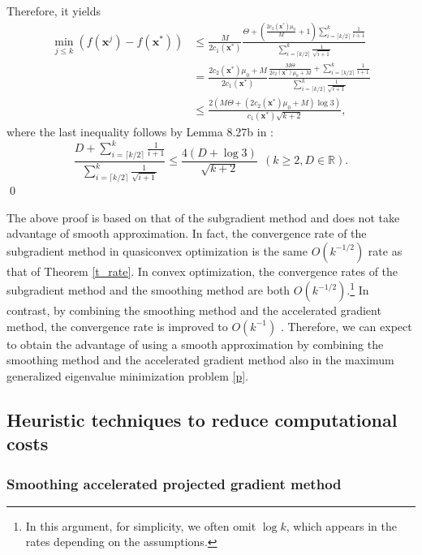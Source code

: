 \documentclass[sn-mathphys,Numbered]{sn-jnl}%
\theoremstyle{thmstyleone}%
\theoremstyle{thmstyletwo}%
\theoremstyle{thmstylethree}%
\newcommand{\e}[1]{\begin{equation}#1\end{equation}}
\begin{document}
Therefore, it yields
\begin{align}
\underset{j\le k}{\min}\left(f(\bm{x}^j)-f(\bm{x}^*)\right)
& \le \frac{M}{2c_1(\bm{x}^*)} \frac{\Theta+\left(\frac{2c_2(\bm{x}^*)\mu_0}{M} + 1\right)\sum_{i=\lceil k/2 \rceil}^{k}\frac{1}{i+1}}{\sum_{i=\lceil k/2 \rceil}^{k}\frac{1}{\sqrt{i+1}}}\\
& = \frac{2c_2(\bm{x}^*)\mu_0+M}{2c_1(\bm{x}^*)} \frac{\frac{M\Theta}{2c_2(\bm{x}^*)\mu_0+M}+\sum_{i=\lceil k/2 \rceil}^{k}\frac{1}{i+1}}{\sum_{i=\lceil k/2 \rceil}^{k}\frac{1}{\sqrt{i+1}}}\\
& \le \frac{2(M\Theta+(2c_2(\bm{x}^*)\mu_0+M)\log 3)}{c_1(\bm{x}^*)\sqrt{k+2}},
\end{align}
where the last inequality follows by Lemma 8.27b in \cite{beck17}:
\e{
\frac{D+\sum_{i=\lceil k/2 \rceil}^{k}\frac{1}{i+1}}{\sum_{i=\lceil k/2 \rceil}^{k}\frac{1}{\sqrt{i+1}}} \le \frac{4(D+\log 3)}{\sqrt{k+2}}\ \ (k\ge 2, D\in\mathbb{R}).
}
\qed

The above proof is based on that of the subgradient method and does not take advantage of smooth approximation. In fact, the convergence rate of the subgradient method in quasiconvex optimization \cite{kiwiel01} is the same $O(k^{-1/2})$ rate as that of Theorem \ref{t_rate}. In convex optimization, the convergence rates of the subgradient method \cite{beck17} and the smoothing method \cite{bian20,bian20c} are both $O(k^{-1/2})$.\footnote{In this argument, for simplicity, we often omit $\log k$, which appears in the rates depending on the assumptions.} In contrast, by combining the smoothing method and the accelerated gradient method, the convergence rate is improved to $O(k^{-1})$ \cite{bian20,tran17}. Therefore, we can expect to obtain the advantage of using a smooth approximation by combining the smoothing method and the accelerated gradient method also in the maximum generalized eigenvalue minimization problem \eqref{p}. 

\subsection{Heuristic techniques to reduce computational costs}

\subsubsection{Smoothing accelerated projected gradient method}
\end{document}
